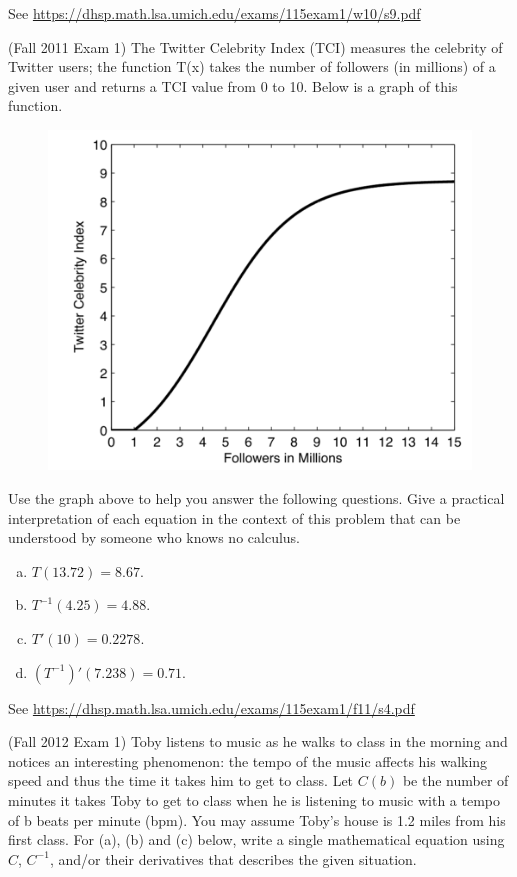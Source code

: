 \documentclass[11pt]{exam}
\begin{document}
\begin{questions}
\begin{enumerate}[(a)]
\end{enumerate}
\begin{solution}
 See \href{https://dhsp.math.lsa.umich.edu/exams/115exam1/w10/s9.pdf}{https://dhsp.math.lsa.umich.edu/exams/115exam1/w10/s9.pdf}
\end{solution}
\question (Fall 2011 Exam 1) The Twitter Celebrity Index (TCI) measures the celebrity of Twitter users; the function T(x) takes the number of followers (in millions) of a given user and returns a TCI value from 0 to 10. Below is a graph of this function.
	\begin{figure}[h]
		\includegraphics[scale=0.4]{Figures/Twitter.png}
	\end{figure}
Use the graph above to help you answer the following questions. Give a practical interpretation of each equation in the context of this problem that can be understood by someone who knows no calculus.
\begin{multicols}{2}
\begin{enumerate}[(a)]
	\item $T(13.72) = 8.67$.
	\item $T^{-1}(4.25) = 4.88$.
	\item $T'(10) = 0.2278$.
	\item $(T^{-1})'(7.238) = 0.71$.
\end{enumerate}
\end{multicols}
\begin{solution}
 See \href{https://dhsp.math.lsa.umich.edu/exams/115exam1/f11/s4.pdf}{https://dhsp.math.lsa.umich.edu/exams/115exam1/f11/s4.pdf}
\end{solution}
\question (Fall 2012 Exam 1) Toby listens to music as he walks to class in the morning and notices an interesting phenomenon: the tempo of the music affects his walking speed and thus the time it takes him to get to class. Let $C(b)$ be the number of minutes it takes Toby to get to class when he is listening to music with a tempo of b beats per minute (bpm). You may assume Toby's house is 1.2 miles from his first class.
	For (a), (b) and (c) below, write a single mathematical equation using $C$, $C^{-1}$, and/or their derivatives that describes the given situation.


\end{questions}
\end{document}
